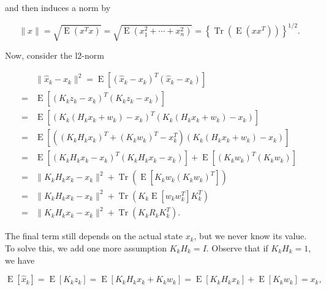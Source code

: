 \documentclass{article}
\begin{document}
            and then induces a norm by

            \begin{equation*}
                 \| x \| = \sqrt{\operatorname{E}(x^{T}x)} =
                 \sqrt{\operatorname{E}(x_{1}^{2} + \cdots + x_{n}^{2})} = 
                     \left\{ \operatorname{Tr}\left( \operatorname{E}(x x^{T})
                     \right) \right\}^{1/2}.
            \end{equation*}

            Now, consider the l2-norm

            \begin{align*}
                 &\| \hat{x}_{k} - x_{k} \|^{2} = \operatorname{E}\left[ (\hat{x}_{k} - x_{k})^{T} (\hat{x}_{k} - x_{k}) \right] \\
                =&\operatorname{E}\left[ \left( K_{k}z_{k} - x_{k} \right)^{T} \left( K_{k}z_{k} - x_{k} \right) \right] \\
                =&\operatorname{E}\left[ \left( K_{k} \left( H_{k}x_{k} + w_{k} \right) - x_{k} \right)^{T} \left( K_{k}\left( H_{k}x_{k} + w_{k} \right) - x_{k} \right) \right] \\
                =&\operatorname{E}\left[ \left( (K_{k}H_{k}x_{k})^{T} + (K_{k}w_{k})^{T} - x_{k}^{T} \right) \left( K_{k}\left( H_{k}x_{k} + w_{k} \right) - x_{k} \right) \right] \\
                =&\operatorname{E}\left[ \left( K_{k}H_{k}x_{k} - x_{k} \right)^{T} \left( K_{k}H_{k}x_{k} - x_{k} \right) \right] + \operatorname{E}\left[ \left( K_{k}w_{k} \right)^{T} (K_{k}w_{k}) \right] \\
                =&\|K_{k}H_{k}x_{k} - x_{k}\|^{2} + \operatorname{Tr}\left( \operatorname{E}\left[ K_{k}w_{k}\left( K_{k}w_{k} \right)^{T} \right] \right) \\
                =&\|K_{k}H_{k}x_{k} - x_{k}\|^{2} + \operatorname{Tr}\left( K_{k} \operatorname{E}[w_{k} w_{k}^{T}] K_{k}^{T} \right) \\
                =&\|K_{k}H_{k}x_{k} - x_{k}\|^{2} + \operatorname{Tr}\left( K_{k} R_{k} K_{k}^{T} \right).
            \end{align*}

            The final term still depends on the actual state $ x_{k} $, but we never know its value. To solve
            this, we add one more assumption $ K_{k}H_{k} = I $. Observe that if $ K_{k}H_{k} = 1 $, we have

            \begin{equation*}
                \operatorname{E}[\hat{x}_{k}] = \operatorname{E}\left[
                    K_{k}z_{k} \right] = \operatorname{E}\left[ K_{k}H_{k}x_{k} +
                K_{k}w_{k} \right] = \operatorname{E}\left[ K_{k}H_{k}x_{k} \right]
                + \operatorname{E}\left[ K_{k}w_{k} \right] = x_{k},
            \end{equation*}
\end{document}
